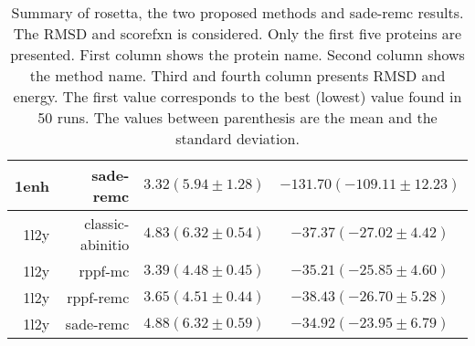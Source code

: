 \begin{table}[ht]
\begin{tabular}{r|r|c|c}
    1enh &          sade-remc & $3.32 (  5.94 \pm   1.28)$ & $-131.70 (-109.11 \pm  12.23)$ \\ \hline
    \hline
    1l2y &   classic-abinitio & $4.83 (  6.32 \pm   0.54)$ & $-37.37 (-27.02 \pm   4.42)$ \\ \hline
    1l2y &            rppf-mc & $3.39 (  4.48 \pm   0.45)$ & $-35.21 (-25.85 \pm   4.60)$ \\ \hline
    1l2y &          rppf-remc & $3.65 (  4.51 \pm   0.44)$ & $-38.43 (-26.70 \pm   5.28)$ \\ \hline
    1l2y &          sade-remc & $4.88 (  6.32 \pm   0.59)$ & $-34.92 (-23.95 \pm   6.79)$ \\ \hline
    \hline
    \end{tabular}
    \caption{Summary of rosetta, the two proposed methods and sade-remc results.
    The RMSD and scorefxn is considered. Only the first five proteins are presented.
    First column shows the protein name. Second column shows the method name.
    Third and fourth column presents RMSD and energy. The first value corresponds
    to the best (lowest) value found in 50 runs. The values between parenthesis are
    the mean and the standard deviation.}
    \label{tab:results-first-half}
\end{table}


